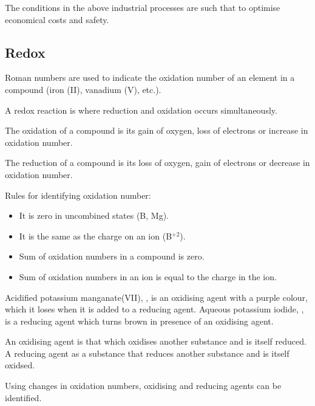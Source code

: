 The conditions in the above industrial processes are such that to optimise economical costs and
safety.

\subsection{Redox}
Roman numbers are used to indicate the oxidation number of an element in a compound (iron (II), 
vanadium (V), etc.).

A redox reaction is where reduction and oxidation occurs simultaneously.

The oxidation of a compound is its gain of oxygen, loss of electrons or increase in oxidation 
number.

The reduction of a compound is its loss of oxygen, gain of electrons or decrease in oxidation
number.

Rules for identifying oxidation number:
\begin{itemize}
	\item It is zero in uncombined states (B, Mg).
	\item It is the same as the charge on an ion (B$^{+2}$).
	\item Sum of oxidation numbers in a compound is zero.
	\item Sum of oxidation numbers in an ion is equal to the charge in the ion.
\end{itemize}
Acidified potassium manganate(VII), , is an oxidising agent with a purple colour, which it
loses when it is added to a reducing agent. Aqueous potassium iodide, , is a reducing agent 
which turns brown in presence of an oxidising agent.

An oxidising agent is that which oxidises another substance and is itself reduced. A reducing agent
as a substance that reduces another substance and is itself oxidsed.

Using changes in oxidation numbers, oxidising and reducing agents can be identified.

